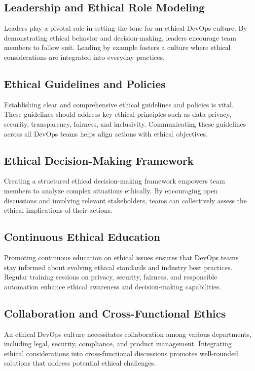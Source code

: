 \documentclass[conference]{IEEEtran}
\begin{document}
\subsection{Leadership and Ethical Role Modeling}
Leaders play a pivotal role in setting the tone for an ethical DevOps culture. By demonstrating ethical behavior and decision-making, leaders encourage team members to follow suit. Leading by example fosters a culture where ethical considerations are integrated into everyday practices.

\subsection{Ethical Guidelines and Policies}
Establishing clear and comprehensive ethical guidelines and policies is vital. These guidelines should address key ethical principles such as data privacy, security, transparency, fairness, and inclusivity. Communicating these guidelines across all DevOps teams helps align actions with ethical objectives.


\subsection{Ethical Decision-Making Framework}
Creating a structured ethical decision-making framework empowers team members to analyze complex situations ethically. By encouraging open discussions and involving relevant stakeholders, teams can collectively assess the ethical implications of their actions.

\subsection{Continuous Ethical Education}
Promoting continuous education on ethical issues ensures that DevOps teams stay informed about evolving ethical standards and industry best practices. Regular training sessions on privacy, security, fairness, and responsible automation enhance ethical awareness and decision-making capabilities.

\subsection{Collaboration and Cross-Functional Ethics}
An ethical DevOps culture necessitates collaboration among various departments, including legal, security, compliance, and product management. Integrating ethical considerations into cross-functional discussions promotes well-rounded solutions that address potential ethical challenges.
\end{document}
